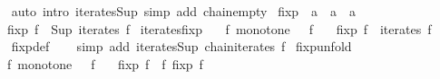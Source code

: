\begin{isabellebody}
%
\isadelimproof
\ \ %
\endisadelimproof
%
\isatagproof
{}\isamarkupfalse%
\ {\isacharparenleft}{\kern0pt}auto\ intro{\isacharcolon}{\kern0pt}\ iterates{\isachardot}{\kern0pt}Sup\ simp\ add{\isacharcolon}{\kern0pt}\ chain{\isacharunderscore}{\kern0pt}empty{\isacharparenright}{\kern0pt}%
\endisatagproof
{\isafoldproof}%
%
\isadelimproof
%
\endisadelimproof
%
\isadelimdocument
%
\endisadelimdocument
%
\isatagdocument
%
\isamarkuptrue%
%
\endisatagdocument
{\isafolddocument}%
%
\isadelimdocument
%
\endisadelimdocument
{}\isamarkupfalse%
\ fixp\ {\isacharcolon}{\kern0pt}{\isacharcolon}{\kern0pt}\ {\isachardoublequoteopen}{\isacharparenleft}{\kern0pt}{\isacharprime}{\kern0pt}a\ {\isasymRightarrow}\ {\isacharprime}{\kern0pt}a{\isacharparenright}{\kern0pt}\ {\isasymRightarrow}\ {\isacharprime}{\kern0pt}a{\isachardoublequoteclose}\isanewline
\ \ \ {\isachardoublequoteopen}fixp\ f\ {\isacharequal}{\kern0pt}\ Sup\ {\isacharparenleft}{\kern0pt}iterates\ f{\isacharparenright}{\kern0pt}{\isachardoublequoteclose}\isanewline
\isanewline
{}\isamarkupfalse%
\ iterates{\isacharunderscore}{\kern0pt}fixp{\isacharcolon}{\kern0pt}\isanewline
\ \ \ f{\isacharcolon}{\kern0pt}\ {\isachardoublequoteopen}monotone\ {\isacharparenleft}{\kern0pt}{\isasymle}{\isacharparenright}{\kern0pt}\ {\isacharparenleft}{\kern0pt}{\isasymle}{\isacharparenright}{\kern0pt}\ f{\isachardoublequoteclose}\isanewline
\ \ \ {\isachardoublequoteopen}fixp\ f\ {\isasymin}\ iterates\ f{\isachardoublequoteclose}\isanewline
%
\isadelimproof
\ \ %
\endisadelimproof
%
\isatagproof
{}\isamarkupfalse%
\ fixp{\isacharunderscore}{\kern0pt}def\isanewline
\ \ \isamarkupfalse%
\ {\isacharparenleft}{\kern0pt}simp\ add{\isacharcolon}{\kern0pt}\ iterates{\isachardot}{\kern0pt}Sup\ chain{\isacharunderscore}{\kern0pt}iterates\ f{\isacharparenright}{\kern0pt}%
\endisatagproof
{\isafoldproof}%
%
\isadelimproof
\isanewline
%
\endisadelimproof
\isanewline
{}\isamarkupfalse%
\ fixp{\isacharunderscore}{\kern0pt}unfold{\isacharcolon}{\kern0pt}\isanewline
\ \ \ f{\isacharcolon}{\kern0pt}\ {\isachardoublequoteopen}monotone\ {\isacharparenleft}{\kern0pt}{\isasymle}{\isacharparenright}{\kern0pt}\ {\isacharparenleft}{\kern0pt}{\isasymle}{\isacharparenright}{\kern0pt}\ f{\isachardoublequoteclose}\isanewline
\ \ \ {\isachardoublequoteopen}fixp\ f\ {\isacharequal}{\kern0pt}\ f\ {\isacharparenleft}{\kern0pt}fixp\ f{\isacharparenright}{\kern0pt}{\isachardoublequoteclose}\isanewline

\end{isabellebody}
